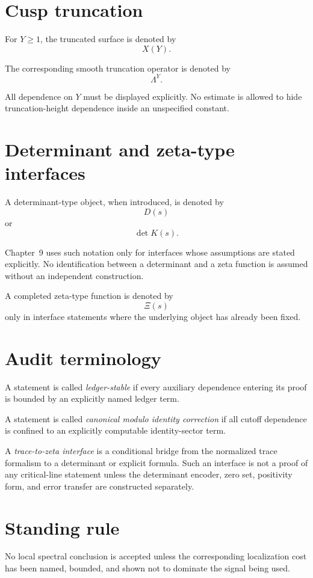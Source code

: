 \section*{Cusp truncation}

For \(Y\ge1\), the truncated surface is denoted by
\[
  X(Y).
\]

The corresponding smooth truncation operator is denoted by
\[
  \Lambda^Y.
\]

All dependence on \(Y\) must be displayed explicitly.  No estimate is allowed to hide truncation-height dependence inside an unspecified constant.

\section*{Determinant and zeta-type interfaces}

A determinant-type object, when introduced, is denoted by
\[
  D(s)
\]
or
\[
  \det K(s).
\]

Chapter~9 uses such notation only for interfaces whose assumptions are stated explicitly.  No identification between a determinant and a zeta function is assumed without an independent construction.

A completed zeta-type function is denoted by
\[
  \Xi(s)
\]
only in interface statements where the underlying object has already been fixed.

\section*{Audit terminology}

A statement is called \emph{ledger-stable} if every auxiliary dependence entering its proof is bounded by an explicitly named ledger term.

A statement is called \emph{canonical modulo identity correction} if all cutoff dependence is confined to an explicitly computable identity-sector term.

A \emph{trace-to-zeta interface} is a conditional bridge from the normalized trace formalism to a determinant or explicit formula.  Such an interface is not a proof of any critical-line statement unless the determinant encoder, zero set, positivity form, and error transfer are constructed separately.

\section*{Standing rule}

No local spectral conclusion is accepted unless the corresponding localization cost has been named, bounded, and shown not to dominate the signal being used.
